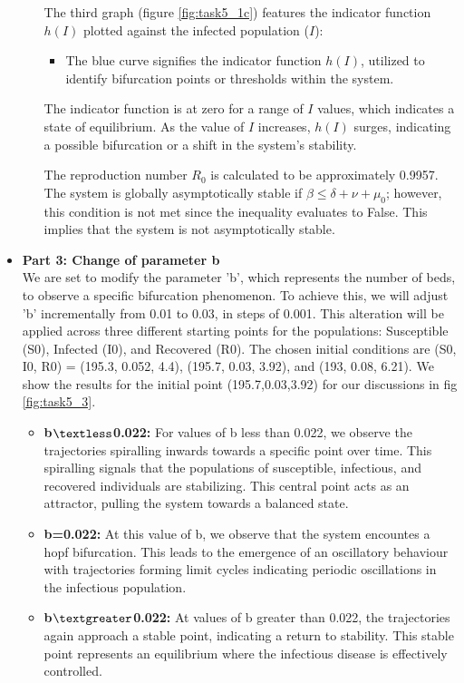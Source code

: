 \begin{itemize}
\begin{itemize}
The third graph (figure \ref{fig:task5_1c}) features the indicator function $h(I)$ plotted against the infected population ($I$):
    \begin{itemize}
        \item The blue curve signifies the indicator function $h(I)$, utilized to identify bifurcation points or thresholds within the system.
    \end{itemize}
The indicator function is at zero for a range of $I$ values, which indicates a state of equilibrium. As the value of $I$ increases, $h(I)$ surges, indicating a possible bifurcation or a shift in the system's stability.

The reproduction number \( R_0 \) is calculated to be approximately 0.9957. The system is globally asymptotically stable if \( \beta \leq \delta + \nu + \mu_0 \); however, this condition is not met since the inequality evaluates to False. This implies that the system is not asymptotically stable.
\end{itemize}

\item \textbf{Part 3: Change of parameter b} \\
We are set to modify the parameter 'b', which represents the number of beds, to observe a specific bifurcation phenomenon. To achieve this, we will adjust 'b' incrementally from 0.01 to 0.03, in steps of 0.001. This alteration will be applied across three different starting points for the populations: Susceptible (S0), Infected (I0), and Recovered (R0). The chosen initial conditions are (S0, I0, R0) = (195.3, 0.052, 4.4), (195.7, 0.03, 3.92), and (193, 0.08, 6.21). We show the results for the initial point (195.7,0.03,3.92) for our discussions in  fig \ref{fig:task5_3}.
\begin{itemize}
    \item \textbf{b$\textless$0.022:} For values of b less than 0.022, we observe the trajectories spiralling inwards towards a specific point over time. This spiralling signals that the populations of susceptible, infectious, and recovered individuals are stabilizing. This central point acts as an attractor, pulling the system towards a balanced state.
    \item \textbf{b=0.022:} At this value of b, we observe that the system encountes a hopf bifurcation. This leads to the emergence of an oscillatory behaviour with trajectories forming limit cycles indicating periodic oscillations in the infectious population.
    \item \textbf{b$\textgreater$0.022:} At values of b greater than 0.022, the trajectories again approach a stable point, indicating a return to stability. This stable point represents an equilibrium where the infectious disease is effectively controlled.
\end{itemize}


\end{itemize}
